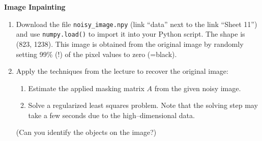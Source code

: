 \textbf{Image Inpainting}
\begin{enumerate}
	\item Download the file \texttt{noisy\_image.npy} (link ``data'' next to the link ``Sheet 11'') and use \texttt{numpy.load()} to import it into your Python script. The shape is (823, 1238). This image is obtained from the original image by randomly setting 99\% (!) of the pixel values to zero (=black).
	\item Apply the techniques from the lecture to recover the original image:
	\begin{enumerate}
		\item Estimate the applied masking matrix $A$ from the given noisy image.
		\item Solve a regularized least squares problem. Note that the solving step may take a few seconds due to the high--dimensional data.
	\end{enumerate}
	(Can you identify the objects on the image?)
\end{enumerate}


